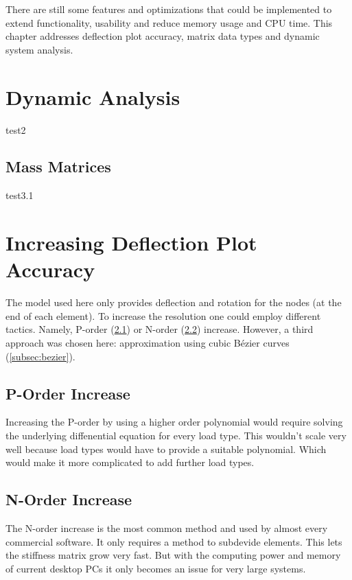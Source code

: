 There are still some features and optimizations that could be implemented to extend functionality, usability and reduce memory usage and CPU time.
This chapter addresses deflection plot accuracy, matrix data types and dynamic system analysis.

\section{Dynamic Analysis}
\label{sec:dynAna}

test2

\subsection{Mass Matrices}
\label{sec:section3.1}

test3.1

\section{Increasing Deflection Plot Accuracy}
\label{sec:deflplotaccu}

The model used here only provides deflection and rotation for the nodes (at the end of each element). To increase the resolution one could employ different tactics.
Namely, P-order (\cref{subsec:porder}) or N-order (\cref{subsec:norder}) increase.
However, a third approach was chosen here: approximation using cubic B\'{e}zier curves (\cref{subsec:bezier}).

\subsection{P-Order Increase}
\label{subsec:porder}

Increasing the P-order by using a higher order polynomial would require solving the underlying diffenential equation for every load type.
This wouldn't scale very well because load types would have to provide a suitable polynomial. Which would make it more complicated to add further load types. 

\subsection{N-Order Increase}
\label{subsec:norder}

The N-order increase is the most common method and used by almost every commercial software. It only requires a method to subdevide elements.
This lets the stiffness matrix grow very fast. But with the computing power and memory of current desktop PCs it only becomes an issue for very large systems.

